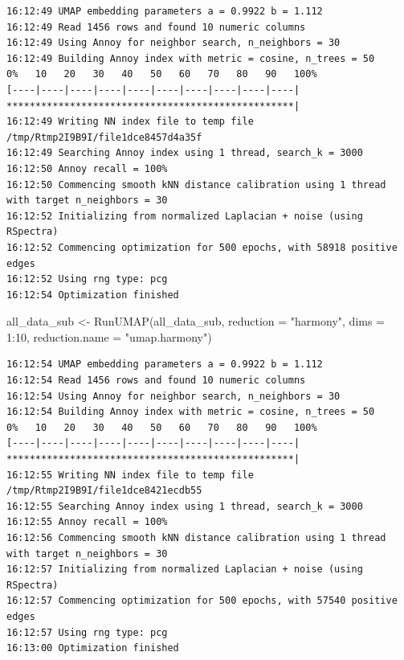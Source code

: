 \documentclass[
  letterpaper,
  DIV=11,
  numbers=noendperiod]{scrreprt}
\newenvironment{Shaded}{\begin{snugshade}}{\end{snugshade}}
\newcommand{\AttributeTok}[1]{\textcolor[rgb]{0.40,0.45,0.13}{#1}}
\newcommand{\DecValTok}[1]{\textcolor[rgb]{0.68,0.00,0.00}{#1}}
\newcommand{\FunctionTok}[1]{\textcolor[rgb]{0.28,0.35,0.67}{#1}}
\newcommand{\NormalTok}[1]{\textcolor[rgb]{0.00,0.23,0.31}{#1}}
\newcommand{\OtherTok}[1]{\textcolor[rgb]{0.00,0.23,0.31}{#1}}
\newcommand{\SpecialCharTok}[1]{\textcolor[rgb]{0.37,0.37,0.37}{#1}}
\newcommand{\StringTok}[1]{\textcolor[rgb]{0.13,0.47,0.30}{#1}}
\begin{document}
\begin{verbatim}
16:12:49 UMAP embedding parameters a = 0.9922 b = 1.112
16:12:49 Read 1456 rows and found 10 numeric columns
16:12:49 Using Annoy for neighbor search, n_neighbors = 30
16:12:49 Building Annoy index with metric = cosine, n_trees = 50
0%   10   20   30   40   50   60   70   80   90   100%
[----|----|----|----|----|----|----|----|----|----|
**************************************************|
16:12:49 Writing NN index file to temp file /tmp/Rtmp2I9B9I/file1dce8457d4a35f
16:12:49 Searching Annoy index using 1 thread, search_k = 3000
16:12:50 Annoy recall = 100%
16:12:50 Commencing smooth kNN distance calibration using 1 thread with target n_neighbors = 30
16:12:52 Initializing from normalized Laplacian + noise (using RSpectra)
16:12:52 Commencing optimization for 500 epochs, with 58918 positive edges
16:12:52 Using rng type: pcg
16:12:54 Optimization finished
\end{verbatim}

\begin{Shaded}
\begin{Highlighting}[]
\NormalTok{all\_data\_sub }\OtherTok{\textless{}{-}} \FunctionTok{RunUMAP}\NormalTok{(all\_data\_sub, }\AttributeTok{reduction =} \StringTok{"harmony"}\NormalTok{, }\AttributeTok{dims =} \DecValTok{1}\SpecialCharTok{:}\DecValTok{10}\NormalTok{, }\AttributeTok{reduction.name =} \StringTok{"umap.harmony"}\NormalTok{)}
\end{Highlighting}
\end{Shaded}

\begin{verbatim}
16:12:54 UMAP embedding parameters a = 0.9922 b = 1.112
16:12:54 Read 1456 rows and found 10 numeric columns
16:12:54 Using Annoy for neighbor search, n_neighbors = 30
16:12:54 Building Annoy index with metric = cosine, n_trees = 50
0%   10   20   30   40   50   60   70   80   90   100%
[----|----|----|----|----|----|----|----|----|----|
**************************************************|
16:12:55 Writing NN index file to temp file /tmp/Rtmp2I9B9I/file1dce8421ecdb55
16:12:55 Searching Annoy index using 1 thread, search_k = 3000
16:12:55 Annoy recall = 100%
16:12:56 Commencing smooth kNN distance calibration using 1 thread with target n_neighbors = 30
16:12:57 Initializing from normalized Laplacian + noise (using RSpectra)
16:12:57 Commencing optimization for 500 epochs, with 57540 positive edges
16:12:57 Using rng type: pcg
16:13:00 Optimization finished
\end{verbatim}
\end{document}
